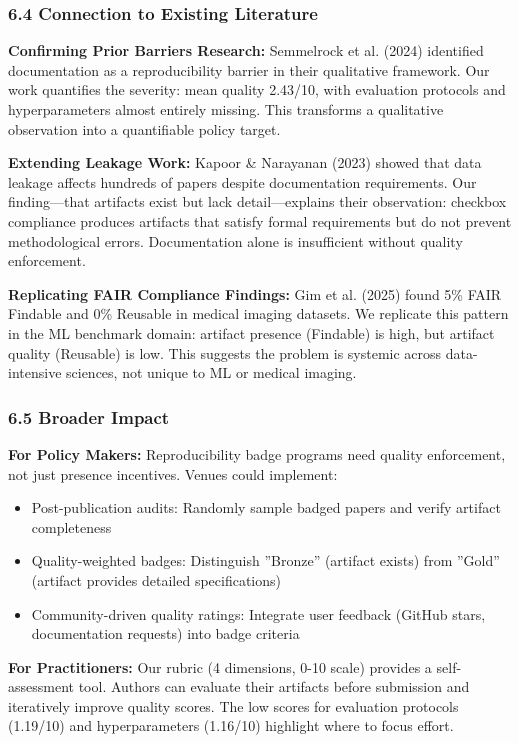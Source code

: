 \subsubsection{6.4 Connection to Existing Literature}

\textbf{Confirming Prior Barriers Research:} Semmelrock et al. (2024) identified documentation as a reproducibility barrier in their qualitative framework. Our work quantifies the severity: mean quality 2.43/10, with evaluation protocols and hyperparameters almost entirely missing. This transforms a qualitative observation into a quantifiable policy target.

\textbf{Extending Leakage Work:} Kapoor \& Narayanan (2023) showed that data leakage affects hundreds of papers despite documentation requirements. Our finding---that artifacts exist but lack detail---explains their observation: checkbox compliance produces artifacts that satisfy formal requirements but do not prevent methodological errors. Documentation alone is insufficient without quality enforcement.

\textbf{Replicating FAIR Compliance Findings:} Gim et al. (2025) found 5\% FAIR Findable and 0\% Reusable in medical imaging datasets. We replicate this pattern in the ML benchmark domain: artifact presence (Findable) is high, but artifact quality (Reusable) is low. This suggests the problem is systemic across data-intensive sciences, not unique to ML or medical imaging.

\subsubsection{6.5 Broader Impact}

\textbf{For Policy Makers:} Reproducibility badge programs need quality enforcement, not just presence incentives. Venues could implement:
\begin{itemize}
\item Post-publication audits: Randomly sample badged papers and verify artifact completeness
\item Quality-weighted badges: Distinguish ''Bronze'' (artifact exists) from ''Gold'' (artifact provides detailed specifications)
\item Community-driven quality ratings: Integrate user feedback (GitHub stars, documentation requests) into badge criteria
\end{itemize}

\textbf{For Practitioners:} Our rubric (4 dimensions, 0-10 scale) provides a self-assessment tool. Authors can evaluate their artifacts before submission and iteratively improve quality scores. The low scores for evaluation protocols (1.19/10) and hyperparameters (1.16/10) highlight where to focus effort.

